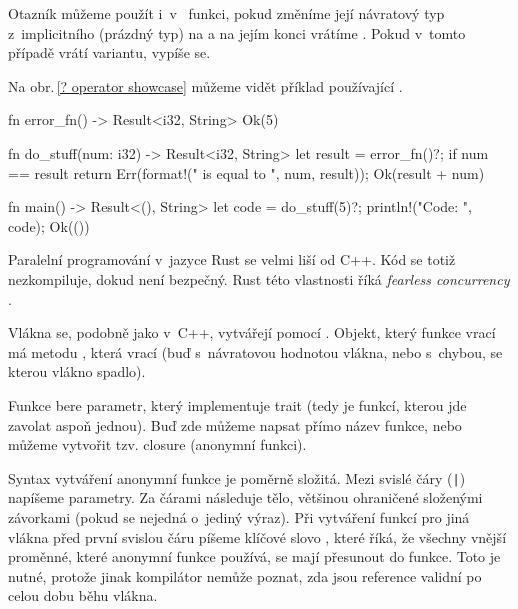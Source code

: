 \documentclass[main.tex]{subfiles}
\begin{document}
Otazník můžeme použít i~v~ funkci, pokud změníme její návratový typ
z~implicitního \irust{()} (prázdný typ) na  a na jejím konci vrátíme
. Pokud v~tomto případě  vrátí  variantu, vypíše se.

Na obr.\,\ref{? operator showcase} můžeme vidět příklad používající .

\obrazek
\begin{rustcode}
fn error_fn() -> Result<i32, String> {
    Ok(5)
}

fn do_stuff(num: i32) -> Result<i32, String> {
    let result = error_fn()?;
    if num == result {
        return Err(format!("{} is equal to {}", num, result));
    }
    Ok(result + num)
}

fn main() -> Result<(), String> {
    let code = do_stuff(5)?;
    println!("Code: {}", code);
    Ok(())
}
\end{rustcode}
\newline
{}


Paralelní programování v~jazyce Rust se velmi liší od C++. Kód se totiž nezkompiluje,
dokud není bezpečný. Rust této vlastnosti říká \emph{fearless concurrency}
\cite[kapitola\,16]{thebook}.


Vlákna se, podobně jako v~C++, vytvářejí pomocí . Objekt, který
funkce vrací má metodu , která vrací  (buď s~návratovou
hodnotou vlákna, nebo s~chybou, se kterou vlákno spadlo).

Funkce  bere  parametr, který implementuje trait 
(tedy je funkcí, kterou jde zavolat aspoň jednou). Buď zde můžeme napsat přímo název
funkce, nebo můžeme vytvořit tzv. closure (anonymní funkci).

Syntax vytváření anonymní funkce je poměrně složitá. Mezi svislé čáry (\texttt{|})
napíšeme parametry. Za čárami následuje tělo, většinou ohraničené složenými závorkami
(pokud se nejedná o~jediný výraz). Při vytváření funkcí pro jiná vlákna před první
svislou čáru píšeme klíčové slovo , které říká, že všechny vnější proměnné,
které anonymní funkce používá, se mají přesunout do funkce. Toto je nutné, protože jinak
kompilátor nemůže poznat, zda jsou reference validní po celou dobu běhu vlákna.
\cite[sekce\,13.1]{thebook}
\end{document}
